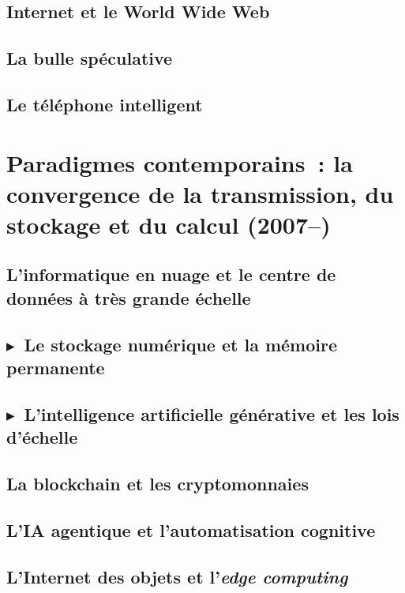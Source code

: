 \subsection{Internet et le World Wide Web}\label{subsec:www}

\subsection{La bulle spéculative}\label{subsec:dotcom}

\subsection{Le téléphone intelligent}\label{subsec:smartphone}


\section{Paradigmes contemporains~: la convergence de la transmission, du stockage et du calcul (2007--)}\label{sec:contemporain}

\subsection{L'informatique en nuage et le centre de données à très grande échelle}\label{subsec:cloud}

\subsection{$\blacktriangleright$~Le stockage numérique et la mémoire permanente}\label{subsec:store}

\subsection{$\blacktriangleright$~L'intelligence artificielle générative et les lois d'échelle}\label{subsec:genai}

\subsection{La blockchain et les cryptomonnaies}\label{subsec:blockchain}

\subsection{L'IA agentique et l'automatisation cognitive}\label{subsec:agentique}

\subsection{L'Internet des objets et l'\emph{edge computing}}\label{subsec:iot}

